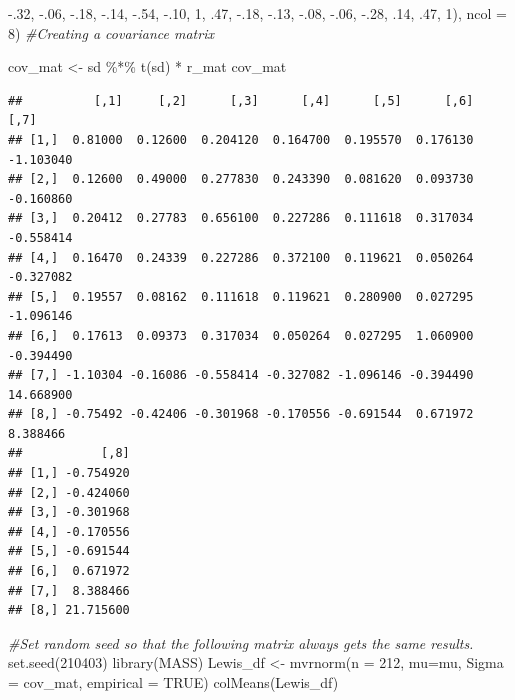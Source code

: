 \documentclass[
]{book}
\newenvironment{Shaded}{\begin{snugshade}}{\end{snugshade}}
\newcommand{\AttributeTok}[1]{\textcolor[rgb]{0.77,0.63,0.00}{#1}}
\newcommand{\CommentTok}[1]{\textcolor[rgb]{0.56,0.35,0.01}{\textit{#1}}}
\newcommand{\ConstantTok}[1]{\textcolor[rgb]{0.00,0.00,0.00}{#1}}
\newcommand{\DecValTok}[1]{\textcolor[rgb]{0.00,0.00,0.81}{#1}}
\newcommand{\FunctionTok}[1]{\textcolor[rgb]{0.00,0.00,0.00}{#1}}
\newcommand{\NormalTok}[1]{#1}
\newcommand{\OtherTok}[1]{\textcolor[rgb]{0.56,0.35,0.01}{#1}}
\newcommand{\SpecialCharTok}[1]{\textcolor[rgb]{0.00,0.00,0.00}{#1}}
\begin{document}
\begin{Shaded}
\begin{Highlighting}[]
        \SpecialCharTok{{-}}\NormalTok{.}\DecValTok{32}\NormalTok{, }\SpecialCharTok{{-}}\NormalTok{.}\DecValTok{06}\NormalTok{, }\SpecialCharTok{{-}}\NormalTok{.}\DecValTok{18}\NormalTok{, }\SpecialCharTok{{-}}\NormalTok{.}\DecValTok{14}\NormalTok{, }\SpecialCharTok{{-}}\NormalTok{.}\DecValTok{54}\NormalTok{, }\SpecialCharTok{{-}}\NormalTok{.}\DecValTok{10}\NormalTok{, }\DecValTok{1}\NormalTok{, .}\DecValTok{47}\NormalTok{,}
        \SpecialCharTok{{-}}\NormalTok{.}\DecValTok{18}\NormalTok{, }\SpecialCharTok{{-}}\NormalTok{.}\DecValTok{13}\NormalTok{, }\SpecialCharTok{{-}}\NormalTok{.}\DecValTok{08}\NormalTok{, }\SpecialCharTok{{-}}\NormalTok{.}\DecValTok{06}\NormalTok{, }\SpecialCharTok{{-}}\NormalTok{.}\DecValTok{28}\NormalTok{, .}\DecValTok{14}\NormalTok{, .}\DecValTok{47}\NormalTok{, }\DecValTok{1}\NormalTok{), }\AttributeTok{ncol =} \DecValTok{8}\NormalTok{)}
\CommentTok{\#Creating a covariance matrix}

\NormalTok{cov\_mat }\OtherTok{\textless{}{-}}\NormalTok{ sd }\SpecialCharTok{\%*\%} \FunctionTok{t}\NormalTok{(sd) }\SpecialCharTok{*}\NormalTok{ r\_mat}
\NormalTok{cov\_mat}
\end{Highlighting}
\end{Shaded}

\begin{verbatim}
##          [,1]     [,2]      [,3]      [,4]      [,5]      [,6]      [,7]
## [1,]  0.81000  0.12600  0.204120  0.164700  0.195570  0.176130 -1.103040
## [2,]  0.12600  0.49000  0.277830  0.243390  0.081620  0.093730 -0.160860
## [3,]  0.20412  0.27783  0.656100  0.227286  0.111618  0.317034 -0.558414
## [4,]  0.16470  0.24339  0.227286  0.372100  0.119621  0.050264 -0.327082
## [5,]  0.19557  0.08162  0.111618  0.119621  0.280900  0.027295 -1.096146
## [6,]  0.17613  0.09373  0.317034  0.050264  0.027295  1.060900 -0.394490
## [7,] -1.10304 -0.16086 -0.558414 -0.327082 -1.096146 -0.394490 14.668900
## [8,] -0.75492 -0.42406 -0.301968 -0.170556 -0.691544  0.671972  8.388466
##           [,8]
## [1,] -0.754920
## [2,] -0.424060
## [3,] -0.301968
## [4,] -0.170556
## [5,] -0.691544
## [6,]  0.671972
## [7,]  8.388466
## [8,] 21.715600
\end{verbatim}

\begin{Shaded}
\begin{Highlighting}[]
\CommentTok{\#Set random seed so that the following matrix always gets the same results.}
\FunctionTok{set.seed}\NormalTok{(}\DecValTok{210403}\NormalTok{)}
\FunctionTok{library}\NormalTok{(MASS)}
\NormalTok{Lewis\_df }\OtherTok{\textless{}{-}} \FunctionTok{mvrnorm}\NormalTok{(}\AttributeTok{n =} \DecValTok{212}\NormalTok{, }\AttributeTok{mu=}\NormalTok{mu, }\AttributeTok{Sigma =}\NormalTok{ cov\_mat, }\AttributeTok{empirical =} \ConstantTok{TRUE}\NormalTok{)}
\FunctionTok{colMeans}\NormalTok{(Lewis\_df)}
\end{Highlighting}
\end{Shaded}
\end{document}

